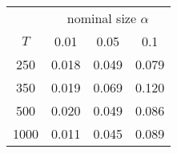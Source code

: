 % 
\begin{tabular}{cccc}
  \hline
  & \multicolumn{3}{c}{nominal size $\alpha$} \\
 $T$ & 0.01 & 0.05 & 0.1 \\
 \hline
250 & 0.018 & 0.049 & 0.079 \\ 
  350 & 0.019 & 0.069 & 0.120 \\ 
  500 & 0.020 & 0.049 & 0.086 \\ 
  1000 & 0.011 & 0.045 & 0.089 \\ 
   \hline
\end{tabular}

